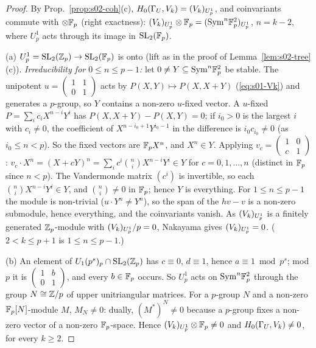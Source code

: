 \begin{proof}
By Prop.~\ref{prop:s02-coh}(c), $H_0(\Gamma_U,V_k)=(V_k)_{U^1_p}$, and coinvariants commute with $\otimes\mathbb{F}_p$ (right exactness):
$(V_k)_{U^1_p}\otimes\mathbb{F}_p=(\mathrm{Sym}^n\mathbb{F}_p^2)_{U^1_p}$, $n=k-2$, where $U^1_p$ acts through its image in $\mathrm{SL}_2(\mathbb{F}_p)$.

(a) $U^1_p=\mathrm{SL}_2(\mathbb{Z}_p)\to\mathrm{SL}_2(\mathbb{F}_p)$ is onto (lift as in the proof of Lemma~\ref{lem:s02-tree}(c)). \emph{Irreducibility for $0\le n\le p-1$:} let $0\ne Y\subseteq\mathrm{Sym}^n\mathbb{F}_p^2$
be stable. The unipotent $u=\left(\begin{smallmatrix}1&1\\0&1\end{smallmatrix}\right)$ acts by $P(X,Y)\mapsto P(X,X+Y)$ (\eqref{eq:s01-Vk}) and generates a $p$-group, so $Y$
contains a non-zero $u$-fixed vector. A $u$-fixed $P=\sum_ic_iX^{n-i}Y^i$ has $P(X,X+Y)-P(X,Y)=0$; if $i_0>0$ is the largest $i$ with $c_i\ne0$, the coefficient of
$X^{n-i_0+1}Y^{i_0-1}$ in the difference is $i_0c_{i_0}\ne0$ (as $i_0\le n<p$). So the fixed vectors are $\mathbb{F}_pX^n$, and $X^n\in Y$. Applying
$v_c=\left(\begin{smallmatrix}1&0\\c&1\end{smallmatrix}\right)$: $v_c\cdot X^n=(X+cY)^n=\sum_ic^i\binom niX^{n-i}Y^i\in Y$ for $c=0,1,\dots,n$ (distinct in $\mathbb{F}_p$ since
$n<p$). The Vandermonde matrix $(c^i)$ is invertible, so each $\binom niX^{n-i}Y^i\in Y$, and $\binom ni\ne0$ in $\mathbb{F}_p$; hence $Y$ is everything. For $1\le n\le p-1$ the module
is non-trivial ($u\cdot Y^n\ne Y^n$), so the span of the $hv-v$ is a non-zero submodule, hence everything, and the coinvariants vanish. As
$(V_k)_{U^1_p}$ is a finitely generated $\mathbb{Z}_p$-module with $(V_k)_{U^1_p}/p=0$, Nakayama gives $(V_k)_{U^1_p}=0$. ($2<k\le p+1$ is $1\le n\le p-1$.)

(b) An element of $U_1(p^s)_p\cap\mathrm{SL}_2(\mathbb{Z}_p)$ has $c\equiv0$, $d\equiv1$, hence $a\equiv1\bmod p^s$; mod $p$ it is $\left(\begin{smallmatrix}1&b\\0&1\end{smallmatrix}\right)$, and
every $b\in\mathbb{F}_p$ occurs. So $U^1_p$ acts on $\mathrm{Sym}^n\mathbb{F}_p^2$ through the group $N\cong\mathbb{Z}/p$ of upper unitriangular matrices. For a $p$-group $N$ and a non-zero
$\mathbb{F}_p[N]$-module $M$, $M_N\ne0$: dually, $(M^*)^N\ne0$ because a $p$-group fixes a non-zero vector of a non-zero $\mathbb{F}_p$-space. Hence
$(V_k)_{U^1_p}\otimes\mathbb{F}_p\ne0$ and $H_0(\Gamma_U,V_k)\ne0$, for every $k\ge2$.
\end{proof}

